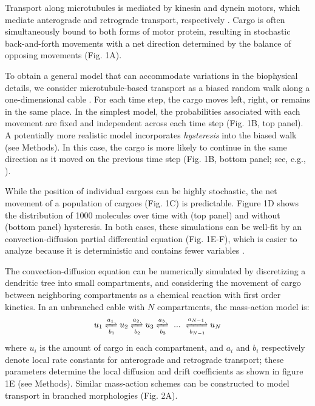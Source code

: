 \documentclass[10pt]{wlpeerj}
\begin{document}
Transport along microtubules is mediated by kinesin and dynein motors, which mediate anterograde and retrograde transport, respectively \citep{Hirokawa_2010,Gagnon_2011}.
Cargo is often simultaneously bound to both forms of motor protein, resulting in stochastic back-and-forth movements with a net direction determined by the balance of opposing movements \citep{Hancock_2014,Buxbaum_2014b} (Fig. 1A).

To obtain a general model that can accommodate variations in the biophysical details, we consider microtubule-based transport as a biased random walk along a one-dimensional cable \citep{Bressloff_2006,Newby_2010,Bressloff_2009}.
For each time step, the cargo moves left, right, or remains in the same place.
In the simplest model, the probabilities associated with each movement are fixed and independent across each time step (Fig. 1B, top panel).
A potentially more realistic model incorporates \textit{hysteresis} into the biased walk (see Methods). In this case, the cargo is more likely to continue in the same direction as it moved on the previous time step (Fig. 1B, bottom panel; see, e.g., \cite{Soundararajan_2014}).

While the position of individual cargoes can be highly stochastic, the net movement of a population of cargoes (Fig. 1C) is predictable.
Figure 1D shows the distribution of 1000 molecules over time with (top panel) and without (bottom panel) hysteresis.
In both cases, these simulations can be well-fit by an convection-diffusion partial differential equation (Fig. 1E-F), which is easier to analyze because it is deterministic and contains fewer variables \citep{Smith_2001}.

The convection-diffusion equation can be numerically simulated by discretizing a dendritic tree into small compartments, and considering the movement of cargo between neighboring compartments as a chemical reaction with first order kinetics. In an unbranched cable with $N$ compartments, the mass-action model is:
\begin{equation}
u_1 \xrightleftharpoons[b_1]{a_1} u_2 \xrightleftharpoons[b_2]{a_2} u_3 \xrightleftharpoons[b_3]{a_3} ~...~ \xrightleftharpoons[b_{N-1}]{a_{N-1}} u_N
\end{equation}
where $u_i$ is the amount of cargo in each compartment, and $a_i$ and $b_i$ respectively denote local rate constants for anterograde and retrograde transport; these parameters determine the local diffusion and drift coefficients as shown in figure 1E (see Methods). Similar mass-action schemes can be constructed to model transport in branched morphologies (Fig. 2A).
\end{document}
